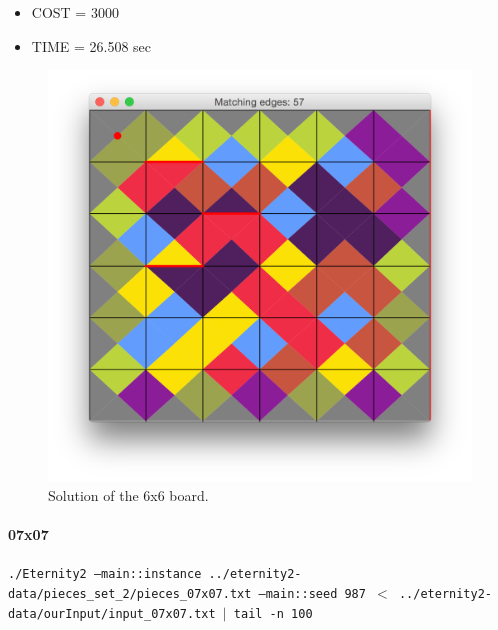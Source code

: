 	\begin{itemize}
		\item COST = 3000
		\item TIME = 26.508 sec
	\end{itemize}
	\begin{figure}[H]
	\centering
	\includegraphics[scale=0.25]{img/sol_06x06}
	\caption{Solution of the 6x6 board.}
	\end{figure}



	\paragraph{07x07}
	\texttt{./Eternity2 --main::instance ../eternity2-data/pieces\_set\_2/pieces\_07x07.txt --main::seed 987 $<$ ../eternity2-data/ourInput/input\_07x07.txt $\mid$ tail -n 100}


